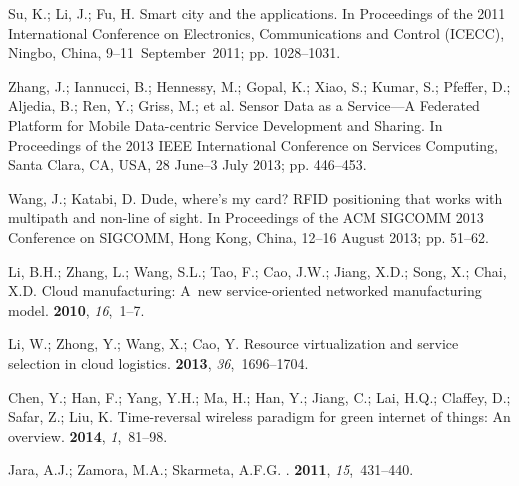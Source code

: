 \documentclass[symmetry,article,accept,moreauthors,pdftex10pt,a4paper]{mdpi}
\begin{document}
\begin{thebibliography}{999}
Su, K.; Li, J.; Fu, H.
\newblock Smart city and the applications. In Proceedings of the 2011 International Conference on Electronics, Communications and Control (ICECC), Ningbo, China, 9--11~September~2011;
\newblock  pp. 1028--1031.

Zhang, J.; Iannucci, B.; Hennessy, M.; Gopal, K.; Xiao, S.; Kumar, S.; Pfeffer,
D.; Aljedia, B.; Ren, Y.; Griss, M.; et al.
\newblock Sensor Data as a Service---A Federated Platform for Mobile
Data-centric Service Development and Sharing.
\newblock In Proceedings of the 2013 IEEE International Conference on Services Computing, Santa Clara, CA, USA, 28 June--3 July 2013; pp.
446--453.

Wang, J.; Katabi, D.
\newblock Dude, where's my card? RFID positioning that works with multipath and
non-line of sight. In Proceedings of the ACM SIGCOMM 2013 Conference on SIGCOMM,
\newblock Hong Kong, China, 12--16 August 2013; pp. 51--62.

Li, B.H.; Zhang, L.; Wang, S.L.; Tao, F.; Cao, J.W.; Jiang, X.D.; Song, X.;
Chai, X.D.
\newblock Cloud manufacturing: A~new service-oriented networked manufacturing
model.
 {\bf 2010}, {\em 16},~1--7.

Li, W.; Zhong, Y.; Wang, X.; Cao, Y. %
\newblock Resource virtualization and service selection in cloud logistics.
 {\bf 2013}, {\em
	36},~1696--1704.

Chen, Y.; Han, F.; Yang, Y.H.; Ma, H.; Han, Y.; Jiang, C.; Lai, H.Q.; Claffey,
D.; Safar, Z.; Liu, K.
\newblock Time-reversal wireless paradigm for green internet of things: An
overview.
 {\bf 2014}, {\em 1},~81--98.

Jara, A.J.; Zamora, M.A.; Skarmeta, A.F.G.
.
 {\bf {2011}}, {\em
	{15}},~{431--440}.


\end{thebibliography}
\end{document}
